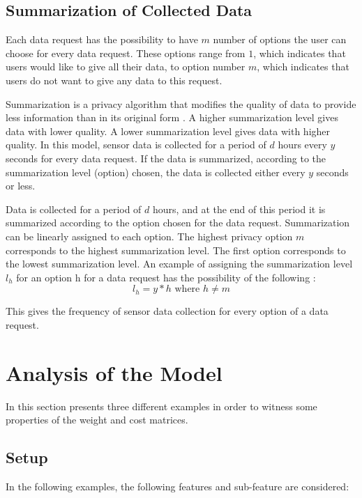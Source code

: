 \subsection{Summarization of Collected Data} \label{summa}
Each data request has the possibility to have $m$ number of options the user can choose for every data request. These options range from $1$, which indicates that users would like to give all their data, to option number $m$, which indicates that users do not want to give any data to this request.

Summarization is a privacy algorithm that modifies the quality of data to provide less information than in its original form \cite{pournaras2016self}. A higher summarization level gives data with lower quality. A lower summarization level gives data with higher quality. In this model, sensor data is collected for a period of $d$ hours every $y$ seconds for every data request. If the data is summarized, according to the summarization level (option) chosen, the data is collected either every $y$ seconds or less.

Data is collected for a period of $d$ hours, and at the end of this period it is summarized according to the option chosen for the data request. Summarization can
be linearly assigned to each option.
The highest privacy option $m$ corresponds to the highest summarization level. The first option corresponds to the lowest summarization level. An example of assigning the summarization level $l_{h}$ for an option h for a data request has the possibility of the following :
\begin{equation}
l_{h} = y*h \text{ where } h \neq m
\end{equation}

This gives the frequency of sensor data collection for every option of a data request.

\section{Analysis of the Model} \label{analysis_model}
In this section presents three different examples in order to witness some properties of the weight and cost matrices.

\subsection{Setup}
In the following examples, the following features and sub-feature are considered:

